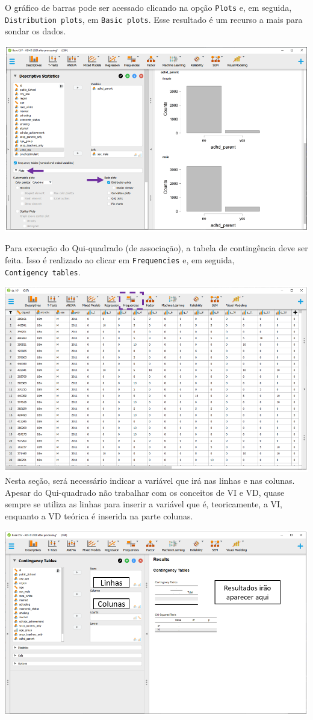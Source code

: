 \documentclass[
]{book}
\begin{document}
O gráfico de barras pode ser acessado clicando na opção \texttt{Plots}
e, em seguida, \texttt{Distribution\ plots}, em \texttt{Basic\ plots}.
Esse resultado é um recurso a mais para sondar os dados.

\includegraphics{./img/cap_x2_grafico.png}

Para execução do Qui-quadrado (de associação), a tabela de contingência
deve ser feita. Isso é realizado ao clicar em \texttt{Frequencies} e, em
seguida, \texttt{Contigency\ tables}.

\includegraphics{./img/cap_x2_interface.png} Nesta seção, será
necessário indicar a variável que irá nas linhas e nas colunas. Apesar
do Qui-quadrado não trabalhar com os conceitos de VI e VD, quase sempre
se utiliza as linhas para inserir a variável que é, teoricamente, a VI,
enquanto a VD teórica é inserida na parte colunas.

\includegraphics{./img/cap_x2_interface2.png}
\end{document}
